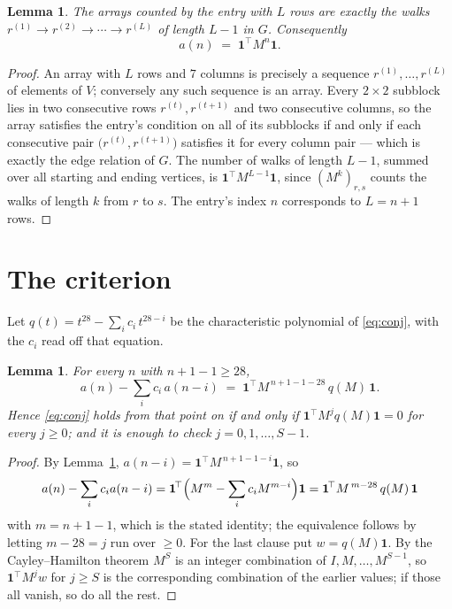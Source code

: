 \documentclass[11pt,a4paper]{article}
\theoremstyle{plain}
\newtheorem{lemma}[theorem]{Lemma}
\theoremstyle{definition}
\begin{document}
\begin{lemma}\label{lem:walk}
The arrays counted by the entry with $L$ rows are exactly the walks
$r^{(1)}\to r^{(2)}\to\cdots\to r^{(L)}$ of length $L-1$ in $G$. Consequently
\[
a(n)\;=\;\mathbf{1}^{\!\top}M^{n}\mathbf{1} .
\]
\end{lemma}

\begin{proof}
An array with $L$ rows and $7$ columns is precisely a sequence
$r^{(1)},\dots,r^{(L)}$ of elements of $V$; conversely any such sequence is an array.
Every $2\times2$ subblock lies in two consecutive rows $r^{(t)},r^{(t+1)}$ and two
consecutive columns, so the array satisfies the entry's condition on all of its subblocks
if and only if each consecutive pair $\bigl(r^{(t)},r^{(t+1)}\bigr)$ satisfies it for
every column pair --- which is exactly the edge relation of $G$. The number of walks of
length $L-1$, summed over all starting and ending vertices, is
$\mathbf{1}^{\!\top}M^{L-1}\mathbf{1}$, since $(M^{k})_{r,s}$ counts the walks of
length $k$ from $r$ to $s$. The entry's index $n$ corresponds to $L=n+1$ rows.
\end{proof}

\section{The criterion}

Let $q(t)=t^{28}-\sum_i c_i\,t^{28-i}$ be the characteristic polynomial of
\eqref{eq:conj}, with the $c_i$ read off that equation.

\begin{lemma}\label{lem:crit}
For every $n$ with $n+1-1\ge28$,
\[
a(n)-\sum_i c_i\,a(n-i)\;=\;\mathbf{1}^{\!\top}M^{\,n+1-1-28}\,q(M)\,\mathbf{1} .
\]
Hence \eqref{eq:conj} holds from that point on if and only if
$\mathbf{1}^{\!\top}M^{j}q(M)\mathbf{1}=0$ for every $j\ge0$; and it is enough to check
$j=0,1,\dots,S-1$.
\end{lemma}

\begin{proof}
By Lemma~\ref{lem:walk}, $a(n-i)=\mathbf{1}^{\!\top}M^{\,n+1-1-i}\mathbf{1}$, so
\[
a(n)-\sum_i c_i a(n-i)
=\mathbf{1}^{\!\top}\Bigl(M^{m}-\sum_i c_i M^{m-i}\Bigr)\mathbf{1}
=\mathbf{1}^{\!\top}M^{\,m-28}\,q(M)\,\mathbf{1}
\]
with $m=n+1-1$, which is the stated identity; the equivalence follows by letting
$m-28=j$ run over $\ge0$. For the last clause put $w=q(M)\mathbf{1}$. By the
Cayley--Hamilton theorem $M^{S}$ is an integer combination of $I,M,\dots,M^{S-1}$, so
$\mathbf{1}^{\!\top}M^{j}w$ for $j\ge S$ is the corresponding combination of the earlier
values; if those all vanish, so do all the rest.
\end{proof}
\end{document}

